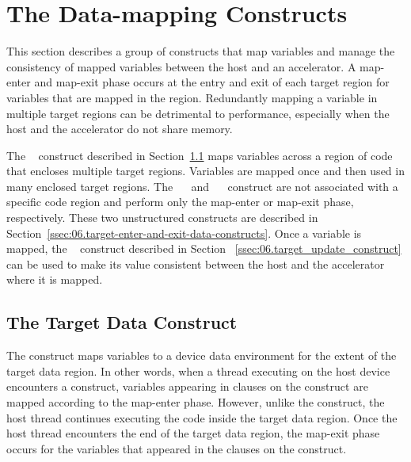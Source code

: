 \section{The Data-mapping Constructs}
\label{sec:06.data_mapping_constructs}

This section describes a group of constructs that map variables and manage the
consistency of mapped variables between the host and an accelerator.  A
map-enter and map-exit phase occurs at the entry and exit of each target region
for variables that are mapped in the region.  Redundantly mapping a variable in
multiple target regions can be detrimental to performance, especially when the
host and the accelerator do not share memory.

The ~ construct described in
Section~\ref{ssec:06.target_data_construct} maps variables across a region of
code that encloses multiple target regions.  Variables are mapped once and then
used in many enclosed target regions.  The
~~ and
~~ construct are not associated with a
specific code region and perform only the map-enter or map-exit phase,
respectively.  These two unstructured constructs are described in
Section~\ref{ssec:06.target-enter-and-exit-data-constructs}.  Once a variable
is mapped, the ~ construct described in Section~
\ref{ssec:06.target_update_construct} can be used to make its value consistent
between the host and the accelerator where it is mapped.


\subsection{The Target Data Construct}
\label{ssec:06.target_data_construct}

The  construct maps variables to a device data environment
for the extent of the target data region.  In other words, when a thread
executing on the host device encounters a  construct,
variables appearing in  clauses on the construct are mapped according
to the map-enter phase.  However, unlike the  construct, the host
thread continues executing the code inside the target data region.  Once the
host thread encounters the end of the target data region, the map-exit phase
occurs for the variables that appeared in the  clauses on the
construct. 

